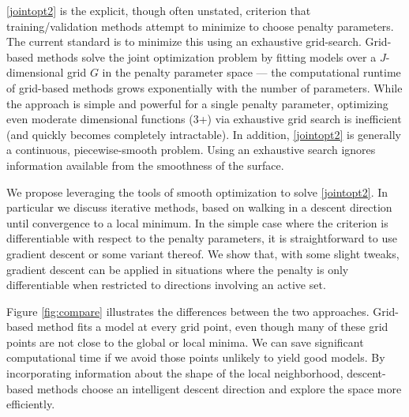 \documentclass[10pt,letterpaper]{article}
\begin{document}
\eqref{jointopt2} is the explicit, though often unstated, criterion that training/validation methods attempt to minimize to choose penalty parameters. The current standard is to minimize this using an exhaustive grid-search. Grid-based methods solve the joint optimization problem by fitting models over a $J$-dimensional grid $G$ in the penalty parameter space --- the computational runtime of grid-based methods grows exponentially with the number of parameters. While the approach is simple and powerful for a single penalty parameter, optimizing even moderate dimensional functions (3+) via exhaustive grid search is inefficient (and quickly becomes completely intractable).  In addition, \eqref{jointopt2} is generally a continuous, piecewise-smooth problem. Using an exhaustive search ignores information available from the smoothness of the surface. 

We propose leveraging the tools of smooth optimization to solve \eqref{jointopt2}. In particular we discuss iterative methods, based on walking in a descent direction until convergence to a local minimum. In the simple case where the criterion is differentiable with respect to the penalty parameters, it is straightforward to use gradient descent or some variant thereof. We show that, with some slight tweaks, gradient descent can be applied in situations where the penalty is only differentiable when restricted to directions involving an active set.

Figure \ref{fig:compare} illustrates the differences between the two approaches. Grid-based method fits a model at every grid point, even though many of these grid points are not close to the global or local minima. We can save significant computational time if we avoid those points unlikely to yield good models. By incorporating information about the shape of the local neighborhood, descent-based methods choose an intelligent descent direction and explore the space more efficiently. 
\end{document}

